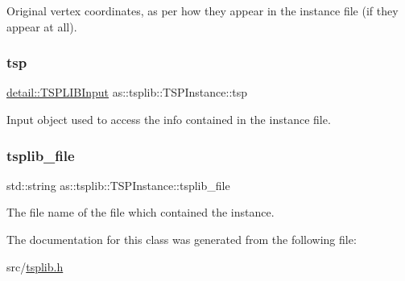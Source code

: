 Original vertex coordinates, as per how they appear in the instance file (if they appear at all). 

\mbox{\label{classas_1_1tsplib_1_1TSPInstance_a6a73219aae354011c905255dc687122b}} 
\subsubsection{\texorpdfstring{tsp}{tsp}}
{\footnotesize\ttfamily \hyperlink{classas_1_1tsplib_1_1detail_1_1TSPLIBInput}{detail\+::\+T\+S\+P\+L\+I\+B\+Input} as\+::tsplib\+::\+T\+S\+P\+Instance\+::tsp\hspace{0.3cm}{\ttfamily [protected]}}



Input object used to access the info contained in the instance file. 

\mbox{\label{classas_1_1tsplib_1_1TSPInstance_a6b2d4d7ad5e12825ceee49d32cdc28af}} 
\subsubsection{\texorpdfstring{tsplib\+\_\+file}{tsplib\_file}}
{\footnotesize\ttfamily std\+::string as\+::tsplib\+::\+T\+S\+P\+Instance\+::tsplib\+\_\+file\hspace{0.3cm}{\ttfamily [protected]}}



The file name of the file which contained the instance. 



The documentation for this class was generated from the following file\+:\begin{DoxyCompactItemize}
\item 
src/\hyperlink{tsplib_8h}{tsplib.\+h}\end{DoxyCompactItemize}
